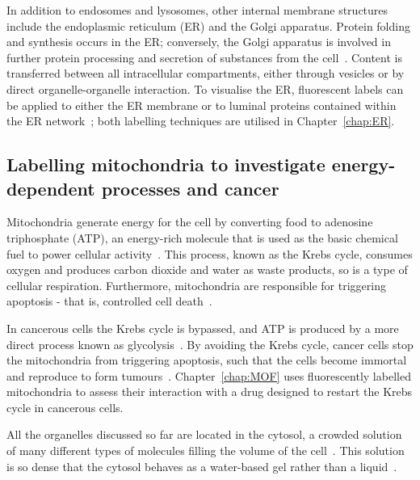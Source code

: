 In addition to endosomes and lysosomes, other internal membrane structures include the endoplasmic reticulum (ER) and the Golgi apparatus. 
Protein folding and synthesis occurs in the ER; conversely, the Golgi apparatus is involved in further protein processing and secretion of substances from the cell~\cite{dyson1978cell}. 
Content is transferred between all intracellular compartments, either through vesicles or by direct organelle-organelle interaction. 
To visualise the ER, fluorescent labels can be applied to either the ER membrane or to luminal proteins contained within the ER network~\cite{costantini2013probing}; both labelling techniques are utilised in Chapter~\ref{chap:ER}.  

\subsection{Labelling mitochondria to investigate energy-dependent processes and cancer}
Mitochondria generate energy for the cell by converting food to adenosine triphosphate (ATP), an energy-rich molecule that is used as the basic chemical fuel to power cellular activity~\cite{alberts2013essential}. 
This process, known as the Krebs cycle, consumes oxygen and produces carbon dioxide and water as waste products, so is a type of cellular respiration. 
Furthermore, mitochondria are responsible for triggering apoptosis - that is, controlled cell death~\cite{murray1993cell}. 

In cancerous cells the Krebs cycle is bypassed, and ATP is produced by a more direct process known as glycolysis~\cite{warburg1930uber}. 
By avoiding the Krebs cycle, cancer cells stop the mitochondria from triggering apoptosis, such that the cells become immortal and reproduce to form tumours~\cite{murray1993cell}. 
Chapter~\ref{chap:MOF} uses fluorescently labelled  mitochondria to assess their interaction with a drug designed to restart the Krebs cycle in cancerous cells. 

All the organelles discussed so far are located in the cytosol, a crowded solution of many different types of molecules filling the volume of the cell~\cite{goodsell1991inside}. 
This solution is so dense that the cytosol behaves as a water-based gel rather than a liquid~\cite{alberts2013essential}. 

